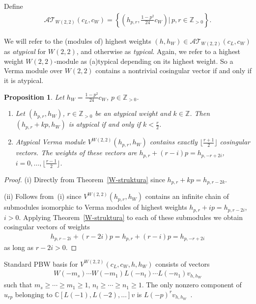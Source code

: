 \documentclass[pdftex]{sigma}
\numberwithin{equation}{section}
\newtheorem{Proposition}[Theorem]{Proposition}
 { \theoremstyle{definition}
\newtheorem{Example}[Theorem]{Example}
\newtheorem{Remark}[Theorem]{Remark} }
\newcommand{\N}{{\mathbb Z}_{> 0} }
\newcommand{\Z}{\mathbb Z}
\newcommand{\C}{\mathbb C}
\begin{document}
Def\/ine
\begin{gather*}
{\mathcal {AT} }_{W(2,2) } ( c_L, c_{W} ) = \left\{ \left(h_{p,r}, \frac{1-p^2}{24}c_W\right) |\, p,r \in \N \right\}.
\end{gather*}
\begin{Remark}
We will refer to the (modules of) highest weights $(h, h_W) \in {\mathcal {AT} }_{W(2,2) } ( c_L, c_{W} ) $ as \textit{atypical} for $W(2,2)$, and otherwise as \textit{typical}. Again, we refer to a highest weight $W(2,2)$-module as (a)typical depending on its highest weight. So a Verma module over $W(2,2)$ contains a nontrivial cosingular vector if and only if it is atypical.
\end{Remark}

\begin{Proposition} \label{svi cosing}
Let $h_W=\frac{1-p^2}{24}c_W$, $p\in\N$.
\begin{enumerate}\itemsep=0pt
\item[$(i)$]Let $(h_{p,r},h_W)$, $r\in\N$ be an atypical weight and $k\in\Z$. Then $(h_{p,r}+kp,h_W)$ is atypical if and only if $k<\frac{r}{2}$.
\item[$(ii)$]Atypical Verma module $V^{W(2,2)}(h_{p,r},h_W)$ contains exactly $\lfloor \frac{r+1}{2} \rfloor$ cosingular vectors. The weights of these vectors are $h_{p,r}+(r-i)p = h_{p,-r+2i}$, $i=0,\ldots,\lfloor \frac{r-1}{2} \rfloor$.
\end{enumerate}
\end{Proposition}

\begin{proof}
(i) Directly from Theorem~\ref{W-struktura} since $h_{p,r}+kp = h_{p,r-2k}$.

(ii) Follows from~(i) since $V^{W(2,2)}(h_{p,r},h_W)$ contains an inf\/inite chain of submodules isomorphic to Verma modules of highest weights $h_{p,r}+ip = h_{p,r-2i}$, $i>0$. Applying Theorem~\ref{W-struktura} to each of these submodules we obtain cosingular vectors of weights
\begin{gather*}
h_{p,r-2i}+(r-2i)p = h_{p,r}+(r-i)p = h_{p,-r+2i}
\end{gather*}
as long as $r-2i>0$.
\end{proof}

\begin{Remark}\label{pbw}
Standard PBW basis for $V^{W(2,2)}(c_{L},c_{W},h,h_{W}) $ consists of vectors
\begin{gather*}
W(-m_{s}) \cdots W(-m_{1}) L(-n_{t}) \cdots L ( -n_{1} ) v_{h,h_W}
\end{gather*}
such that $ m_{s}\geq\cdots\geq m_{1}\geq1$, $n_{t}\geq\cdots\geq n_{1}\geq1 $. The only nonzero component of $u_{rp}$ belonging to $\C [ L(-1) ,L ( -2), \ldots ] v$ is $L(-p)^{r}v_{h,h_W}$~\cite{R-JMP}.
\end{Remark}
\end{document}

